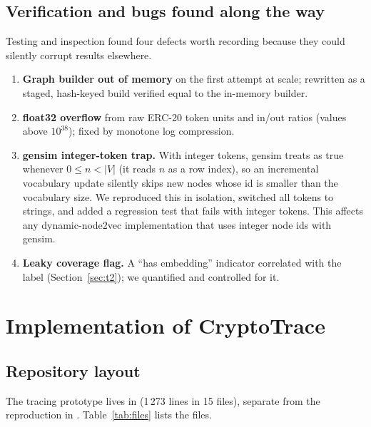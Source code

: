 \subsection{Verification and bugs found along the way}
Testing and inspection found four defects worth recording because they could silently corrupt results elsewhere.
\begin{enumerate}
\item \textbf{Graph builder out of memory} on the first attempt at scale; rewritten as a staged, hash-keyed build verified equal to the in-memory builder.
\item \textbf{float32 overflow} from raw ERC-20 token units and in/out ratios (values above $10^{38}$); fixed by monotone log compression.
\item \textbf{gensim integer-token trap.} With integer tokens, gensim treats  as true whenever $0\le n<|V|$ (it reads $n$ as a row index), so an incremental vocabulary update silently skips new nodes whose id is smaller than the vocabulary size. We reproduced this in isolation, switched all tokens to strings, and added a regression test that fails with integer tokens. This affects any dynamic-node2vec implementation that uses integer node ids with gensim.
\item \textbf{Leaky coverage flag.} A ``has embedding'' indicator correlated with the label (Section~\ref{sec:t2}); we quantified and controlled for it.
\end{enumerate}

\section{Implementation of CryptoTrace}
\subsection{Repository layout}
The tracing prototype lives in  (1\,273 lines in 15 files), separate from the reproduction in . Table~\ref{tab:files} lists the files.

